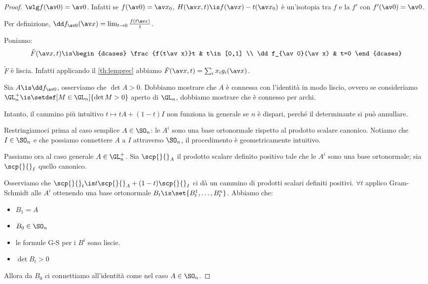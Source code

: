 \begin{proof}
	$\wlg f(\av 0)=\av 0$. Infatti se $f(\av 0)=\av x_0$, $H(\av x,t)\is f(\av x)-t(\av x_0)$ è un'isotopia tra $f$ e la  $f'$ con $f'(\av 0)=\av 0$.
	
	Per definizione, $\dd f_{\av0}(\av x)=\lim_{t\to 0}\frac{f(t\av x)}t$.
	
	Poniamo:
	\[\tilde F(\av x,t)\is
	\begin{dcases}
		\frac{f(t\av x)}t & t\in[0,1] \\
		\dd f_{\av0}(\av x) & t=0
	\end{dcases}\]
	
	\claim $\tilde F$ è liscia. Infatti applicando il \autoref{th:lemprec} abbiamo $\tilde F(\av x,t)=\sum_ix_ig_i(\av x)$.
	
	Sia $A\is\dd f_{\av0}$, osserviamo che $\det A>0$.
	Dobbiamo mostrare che $A$ è connessa con l'identità in modo liscio, ovvero se consideriamo $\GL_n^+\is\setdef[M\in\GL_n]{\det M>0}$ aperto di $\GL_n$, dobbiamo mostrare che è connesso per archi.
	
	Intanto, il cammino più intuitivo $t\mapsto tA+(1-t)I$ non funziona in generale se $n$ è dispari, perché il determinante si può annullare.
	
	Restringiamoci prima al caso semplice $A\in\SO_n$: le $A^i$ sono una base ortonormale rispetto al prodotto scalare canonico. Notiamo che $I\in\SO_n$ e che possiamo connettere $A$ a $I$ attraverso $\SO_n$, il procedimento è geometricamente intuitivo.
	
	 Passiamo ora al caso generale $A\in\GL_n^+$. Sia $\scp{}{}_A$ il prodotto scalare definito positivo tale che le $A^i$ sono una base ortonormale; sia $\scp{}{}_I$ quello canonico.
	 
	 Osserviamo che $\scp{}{}_t\is t\scp{}{}_A+(1-t)\scp{}{}_I$ ci dà un cammino di prodotti scalari definiti positivi. $\forall t$ applico Gram-Schmidt alle $A^i$ ottenendo una base ortonormale $B_t\is\set{B_t^1,\dots,B_t^n}$. Abbiamo che:
	 \begin{itemize}
	 	\item $B_1=A$
		\item $B_0\in\SO_n$
		\item le formule G-S per i $B^i$ sono liscie.
		\item $\det B_t>0$
	 \end{itemize} 
	Allora da $B_0$ ci connettiamo all'identità come nel caso $A\in\SO_n$.
\end{proof}

